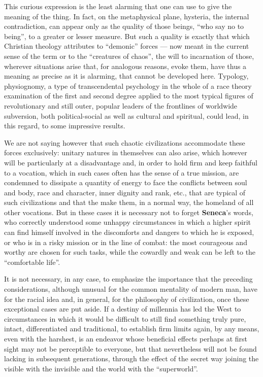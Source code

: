 This curious expression is the least alarming that one can use to give the meaning of the thing. In fact, on the metaphysical plane, hysteria, the internal contradiction, can appear only as the quality of those beings, ``who say no to being'', to a greater or lesser measure. But such a quality is exactly that which Christian theology attributes to ``demonic'' forces --- now meant in the current sense of the term or to the ``creatures of chaos'', the will to incarnation of those, wherever situations arise that, for analogous reasons, evoke them, have thus a meaning as precise as it is alarming, that cannot be developed here. Typology, physiognomy, a type of transcendental psychology in the whole of a race theory examination of the first and second degree applied to the most typical figures of revolutionary and still outer, popular leaders of the frontlines of worldwide subversion, both political-social as well as cultural and spiritual, could lead, in this regard, to some impressive results.

We are not saying however that such chaotic civilizations accommodate these forces exclusively: unitary natures in themselves can also arise, which however will be particularly at a disadvantage and, in order to hold firm and keep faithful to a vocation, which in such cases often has the sense of a true mission, are condemned to dissipate a quantity of energy to face the conflicts between soul and body, race and character, inner dignity and rank, etc., that are typical of such civilizations and that the make them, in a normal way, the homeland of all other vocations. But in these cases it is necessary not to forget \textbf{Seneca}'s words, who correctly understood some unhappy circumstances in which a higher spirit can find himself involved in the discomforts and dangers to which he is exposed, or who is in a risky mission or in the line of combat: the most courageous and worthy are chosen for such tasks, while the cowardly and weak can be left to the ``comfortable life''.

It is not necessary, in any case, to emphasize the importance that the preceding considerations, although unusual for the common mentality of modern man, have for the racial idea and, in general, for the philosophy of civilization, once these exceptional cases are put aside. If a destiny of millennia has led the West to circumstances in which it would be difficult to still find something truly pure, intact, differentiated and traditional, to establish firm limits again, by any means, even with the harshest, is an endeavor whose beneficial effects perhaps at first sight may not be perceptible to everyone, but that nevertheless will not be found lacking in subsequent generations, through the effect of the secret way joining the visible with the invisible and the world with the ``superworld''.


